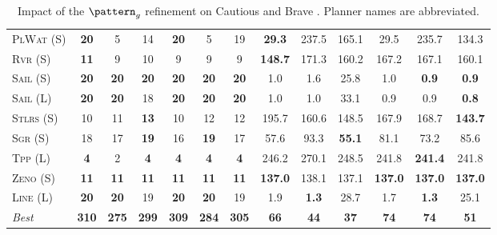 \begin{table}[tb]
{\begin{tabular}{|l||cccccc||cccccc||}
\textsc{PlWat} (S)&\textbf{20}&5&14&\textbf{20}&5&19&\textbf{29.3}&237.5&165.1&29.5&235.7&134.3\\
\textsc{Rvr} (S)&\textbf{11}&9&10&9&9&9&\textbf{148.7}&171.3&160.2&167.2&167.1&160.1\\
\textsc{Sail} (S)&\textbf{20}&\textbf{20}&\textbf{20}&\textbf{20}&\textbf{20}&\textbf{20}&1.0&1.6&25.8&1.0&\textbf{0.9}&\textbf{0.9}\\
\textsc{Sail} (L)&\textbf{20}&\textbf{20}&18&\textbf{20}&\textbf{20}&\textbf{20}&1.0&1.0&33.1&0.9&0.9&\textbf{0.8}\\
\textsc{Stlrs} (S)&10&11&\textbf{13}&10&12&12&195.7&160.6&148.5&167.9&168.7&\textbf{143.7}\\
\textsc{Sgr} (S)&18&17&\textbf{19}&16&\textbf{19}&17&57.6&93.3&\textbf{55.1}&81.1&73.2&85.6\\
\textsc{Tpp} (L)&\textbf{4}&2&\textbf{4}&\textbf{4}&\textbf{4}&\textbf{4}&246.2&270.1&248.5&241.8&\textbf{241.4}&241.8\\
\textsc{Zeno} (S)&\textbf{11}&\textbf{11}&\textbf{11}&\textbf{11}&\textbf{11}&\textbf{11}&\textbf{137.0}&138.1&137.1&\textbf{137.0}&\textbf{137.0}&\textbf{137.0}\\
\textsc{Line} (L)&\textbf{20}&\textbf{20}&19&\textbf{20}&\textbf{20}&19&1.9&\textbf{1.3}&28.7&1.7&\textbf{1.3}&25.1
\\\hline
\textit{Best}&\textbf{310}&\textbf{275}&\textbf{299}&\textbf{309}&\textbf{284}&\textbf{305}&\textbf{66}&\textbf{44}&\textbf{37}&\textbf{74}&\textbf{74}&\textbf{51}\\\hline

        \end{tabular}}
        \caption{Impact of the $\pattern_g$ refinement on Cautious and Brave \pattyd. Planner names are abbreviated.}
        \label{tab:abl-patterng}
        \end{table}
        